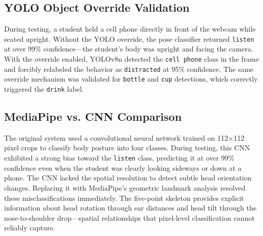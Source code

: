 \documentclass[conference]{IEEEtran}
\begin{document}
\subsection{YOLO Object Override Validation}
During testing, a student held a cell phone directly in front of the webcam while seated upright. Without the YOLO override, the pose classifier returned \texttt{listen} at over 99\% confidence---the student's body was upright and facing the camera. With the override enabled, YOLOv8n detected the \texttt{cell phone} class in the frame and forcibly relabeled the behavior as \texttt{distracted} at 95\% confidence. The same override mechanism was validated for \texttt{bottle} and \texttt{cup} detections, which correctly triggered the \texttt{drink} label.

\subsection{MediaPipe vs. CNN Comparison}
The original system used a convolutional neural network trained on 112$\times$112 pixel crops to classify body posture into four classes. During testing, this CNN exhibited a strong bias toward the \texttt{listen} class, predicting it at over 99\% confidence even when the student was clearly looking sideways or down at a phone. The CNN lacked the spatial resolution to detect subtle head orientation changes. Replacing it with MediaPipe's geometric landmark analysis resolved these misclassifications immediately. The five-point skeleton provides explicit information about head rotation through ear distances and head tilt through the nose-to-shoulder drop---spatial relationships that pixel-level classification cannot reliably capture.
\end{document}
